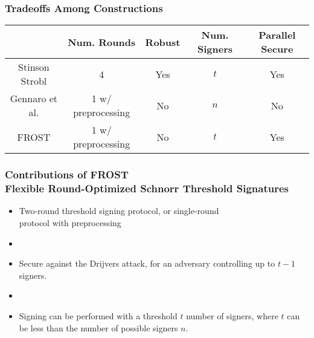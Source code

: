 \documentclass[hyperref={pdfpagelabels=true},table,dvipsnames,14pt,aspectratio=169]{beamer}
\begin{document}
\begin{frame}
  \frametitle{Tradeoffs Among Constructions}

  \begin{table}[t]
    \centering
    \small
    \begin{tabular}{c|c c c c}
      & \textbf{Num. Rounds} & \textbf{Robust} & \textbf{Num. Signers}&
      \textbf{Parallel Secure} \\
      \hline
      Stinson Strobl & 4 & Yes & $t$ & Yes \\
      \hline
      Gennaro et al. & 1 w/ preprocessing & No & $n$ & No \\
      \hline
      FROST & 1 w/ preprocessing & No & $t$ & Yes \\
    \end{tabular}
\end{table}
\end{frame}

\begin{frame}
  \frametitle{Contributions of FROST \\ \small{Flexible Round-Optimized Schnorr Threshold Signatures}}

  \begin{itemize}
    \item<1-> Two-round threshold signing protocol, or single-round \\ protocol with
    preprocessing
    \item[]
    \item<2-> Secure against the Drijvers attack, for an adversary controlling up to $t-1$ signers.
    \item[]
    \item<3-> Signing can be performed with a threshold $t$ number of signers,
      where $t$ can be less than the number of possible signers $n$.
  \end{itemize}
\end{frame}
\end{document}
